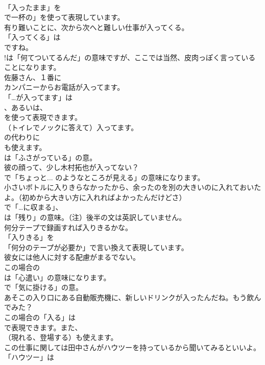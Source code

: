 \documentclass[8pt]{extreport}
\begin{document}
\begin{CJK}{UTF8}{min}
\\	「入ったまま」を
\\	で一杯の」を使って表現しています。	
\\	有り難いことに、次から次へと難しい仕事が入ってくる。 
\\	「入ってくる」は
\\	ですね。
\\	!は「何てついてるんだ」の意味ですが、ここでは当然、皮肉っぽく言っていることになります。	
\\	佐藤さん、１番に
\\	カンパニーからお電話が入ってます。 
\\	「…が入ってます」は
\\	、あるいは、
\\	を使って表現できます。	
\\	（トイレでノックに答えて）入ってます。 
\\	の代わりに 
\\	も使えます。
\\	は「ふさがっている」の意。	
\\	彼の顔って、少し木村拓也が入ってない？ 
\\	で「ちょっと... のようなところが見える」の意味になります。	
\\	小さいボトルに入りきらなかったから、余ったのを別の大きいのに入れておいたよ。（初めから大きい方に入れればよかったんだけどさ） 
\\	で「…に収まる」、
\\	は「残り」の意味。（注）後半の文は英訳していません。	
\\	何分テープで録画すれば入りきるかな。 
\\	「入りきる」を
\\	「何分のテープが必要か」で言い換えて表現しています。	
\\	彼女には他人に対する配慮がまるでない。 
\\	この場合の
\\	は「心遣い」の意味になります。
\\	で「気に掛ける」の意。	
\\	あそこの入り口にある自動販売機に、新しいドリンクが入ったんだね。もう飲んでみた？ 
\\	この場合の「入る」は
\\	で表現できます。また、
\\	（現れる、登場する）も使えます。	
\\	この仕事に関しては田中さんがハウツーを持っているから聞いてみるといいよ。 
\\	「ハウツー」は

\end{CJK}
\end{document}

